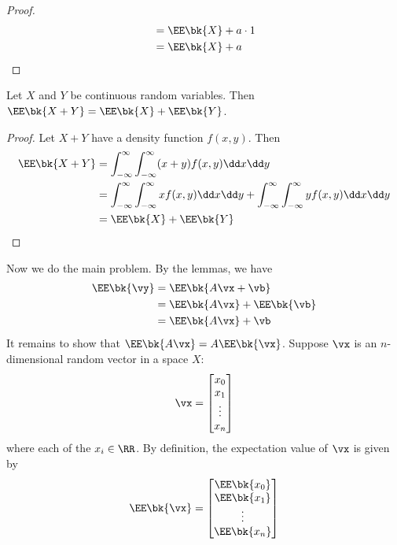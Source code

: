 \documentclass[189]{pset}
\begin{document}
\begin{enumerate}
\begin{proof}
\begin{align*}
            &= \EE\bk{X} + a\cdot 1 \\
            &= \EE\bk{X} + a
          \end{align*}
        \end{proof}
        \begin{lemma}
          Let $X$ and $Y$ be continuous random variables. Then
          $\EE\bk{X+Y} = \EE\bk{X}+\EE\bk{Y}$.
        \end{lemma}
        \begin{proof}
          Let $X+Y$ have a density function $f(x,y)$. Then
          \begin{align*}
            \EE\bk{X+Y}
            &= \int_{-\infty}^\infty \int_{-\infty}^\infty
              (x+y)f(x,y)\dd x \dd y \\
            &= \int_{-\infty}^\infty \int_{-\infty}^\infty xf(x,y) \dd
              x \dd y + \int_{-\infty}^\infty \int_{-\infty}^\infty
              yf(x,y) \dd x \dd y \\
            &= \EE\bk{X} + \EE\bk{Y}
          \end{align*}
        \end{proof}
        Now we do the main problem. By the lemmas, we have
        \begin{align*}
          \EE\bk{\vy}
          &= \EE\bk{A\vx + \vb} \\
          &= \EE\bk{A\vx} + \EE\bk{\vb} \\
          &= \EE\bk{A\vx} + \vb
        \end{align*}
        It remains to show that $\EE\bk{A\vx} = A\EE\bk{\vx}$. Suppose
        $\vx$ is an $n$-dimensional random vector in a space $X$:
        \[
          \vx =
          \begin{bmatrix}
            x_0 \\
            x_1 \\
            \vdots \\
            x_n
          \end{bmatrix}
        \]
        where each of the $x_i \in \RR$. By definition, the
        expectation value of $\vx$ is given by
        \[
          \EE\bk{\vx} =
          \begin{bmatrix}
            \EE\bk{x_0} \\
            \EE\bk{x_1} \\
            \vdots \\
            \EE\bk{x_n}
          \end{bmatrix}
        \]

\end{enumerate}
\end{document}
